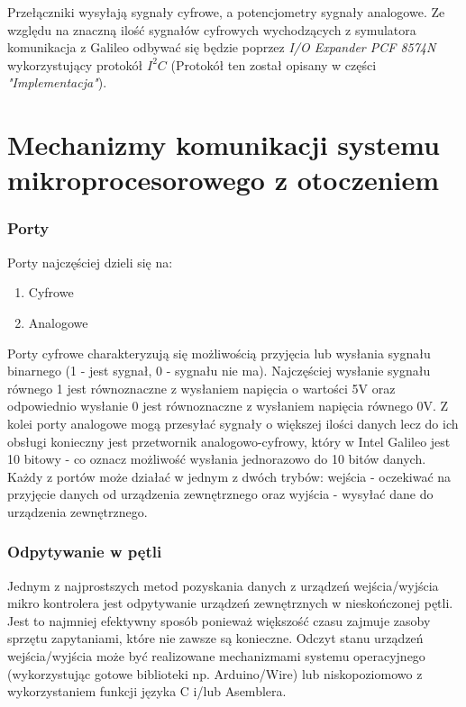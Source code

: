 \documentclass{xmgr}
\begin{document}
Przełączniki wysyłają sygnały cyfrowe, a potencjometry sygnały analogowe. Ze względu na znaczną ilość sygnałów cyfrowych wychodzących z symulatora komunikacja z Galileo odbywać się będzie poprzez \emph{I/O Expander PCF 8574N} wykorzystujący protokół  $I^2C$ (Protokół ten został opisany w części \emph{"Implementacja"}).

\chapter{Mechanizmy komunikacji systemu mikroprocesorowego z otoczeniem}
\subsection{Porty}
Porty najczęściej dzieli się na:
\begin{enumerate}
	\item Cyfrowe
	\item Analogowe
\end{enumerate}

Porty cyfrowe charakteryzują się możliwością przyjęcia lub wysłania sygnału binarnego (1 - jest sygnał, 0 - sygnału nie ma). Najczęściej wysłanie sygnału równego 1 jest równoznaczne z wysłaniem napięcia o wartości 5V oraz odpowiednio wysłanie 0 jest równoznaczne z wysłaniem napięcia równego 0V. Z kolei porty analogowe mogą przesyłać sygnały o większej ilości danych lecz do ich obsługi konieczny jest przetwornik analogowo-cyfrowy, który w Intel Galileo jest 10 bitowy - co oznacz możliwość wysłania jednorazowo do 10 bitów danych. Każdy z portów może działać w jednym  z dwóch trybów: wejścia - oczekiwać na przyjęcie danych od urządzenia zewnętrznego oraz wyjścia - wysyłać dane do urządzenia zewnętrznego.

\subsection{Odpytywanie w pętli}
Jednym z najprostszych metod pozyskania danych z urządzeń wejścia/wyjścia mikro kontrolera jest odpytywanie urządzeń zewnętrznych w nieskończonej pętli. Jest to najmniej efektywny sposób ponieważ większość czasu zajmuje zasoby sprzętu zapytaniami, które nie zawsze są konieczne. Odczyt stanu urządzeń wejścia/wyjścia może być realizowane mechanizmami systemu operacyjnego (wykorzystując gotowe biblioteki np. Arduino/Wire) lub niskopoziomowo z wykorzystaniem funkcji języka C i/lub Asemblera.
\end{document}
